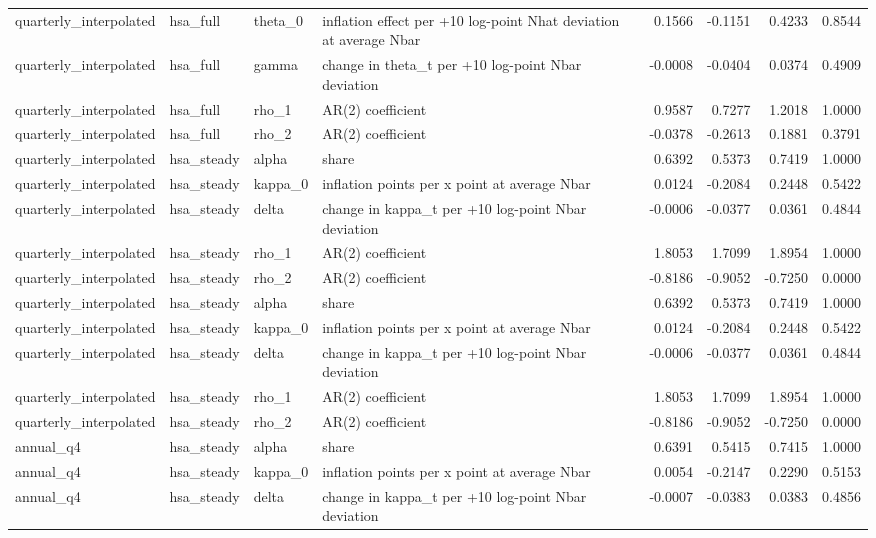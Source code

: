 \begin{tabular}{llllrrrr}
quarterly\_interpolated & hsa\_full & theta\_0 & inflation effect per +10 log-point Nhat deviation at average Nbar & 0.1566 & -0.1151 & 0.4233 & 0.8544 \\
quarterly\_interpolated & hsa\_full & gamma & change in theta\_t per +10 log-point Nbar deviation & -0.0008 & -0.0404 & 0.0374 & 0.4909 \\
quarterly\_interpolated & hsa\_full & rho\_1 & AR(2) coefficient & 0.9587 & 0.7277 & 1.2018 & 1.0000 \\
quarterly\_interpolated & hsa\_full & rho\_2 & AR(2) coefficient & -0.0378 & -0.2613 & 0.1881 & 0.3791 \\
quarterly\_interpolated & hsa\_steady & alpha & share & 0.6392 & 0.5373 & 0.7419 & 1.0000 \\
quarterly\_interpolated & hsa\_steady & kappa\_0 & inflation points per x point at average Nbar & 0.0124 & -0.2084 & 0.2448 & 0.5422 \\
quarterly\_interpolated & hsa\_steady & delta & change in kappa\_t per +10 log-point Nbar deviation & -0.0006 & -0.0377 & 0.0361 & 0.4844 \\
quarterly\_interpolated & hsa\_steady & rho\_1 & AR(2) coefficient & 1.8053 & 1.7099 & 1.8954 & 1.0000 \\
quarterly\_interpolated & hsa\_steady & rho\_2 & AR(2) coefficient & -0.8186 & -0.9052 & -0.7250 & 0.0000 \\
quarterly\_interpolated & hsa\_steady & alpha & share & 0.6392 & 0.5373 & 0.7419 & 1.0000 \\
quarterly\_interpolated & hsa\_steady & kappa\_0 & inflation points per x point at average Nbar & 0.0124 & -0.2084 & 0.2448 & 0.5422 \\
quarterly\_interpolated & hsa\_steady & delta & change in kappa\_t per +10 log-point Nbar deviation & -0.0006 & -0.0377 & 0.0361 & 0.4844 \\
quarterly\_interpolated & hsa\_steady & rho\_1 & AR(2) coefficient & 1.8053 & 1.7099 & 1.8954 & 1.0000 \\
quarterly\_interpolated & hsa\_steady & rho\_2 & AR(2) coefficient & -0.8186 & -0.9052 & -0.7250 & 0.0000 \\
annual\_q4 & hsa\_steady & alpha & share & 0.6391 & 0.5415 & 0.7415 & 1.0000 \\
annual\_q4 & hsa\_steady & kappa\_0 & inflation points per x point at average Nbar & 0.0054 & -0.2147 & 0.2290 & 0.5153 \\
annual\_q4 & hsa\_steady & delta & change in kappa\_t per +10 log-point Nbar deviation & -0.0007 & -0.0383 & 0.0383 & 0.4856 \\

\end{tabular}
